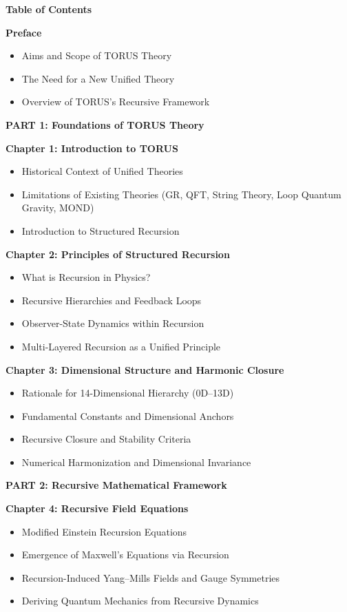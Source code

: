 \documentclass[
]{article}
\author{}
\date{}
\begin{document}
\textbf{Table of Contents}

\textbf{Preface}

\begin{itemize}
\item
  Aims and Scope of TORUS Theory
\item
  The Need for a New Unified Theory
\item
  Overview of TORUS's Recursive Framework
\end{itemize}

\textbf{PART 1: Foundations of TORUS Theory}

\textbf{Chapter 1: Introduction to TORUS}

\begin{itemize}
\item
  Historical Context of Unified Theories
\item
  Limitations of Existing Theories (GR, QFT, String Theory, Loop Quantum
  Gravity, MOND)
\item
  Introduction to Structured Recursion
\end{itemize}

\textbf{Chapter 2: Principles of Structured Recursion}

\begin{itemize}
\item
  What is Recursion in Physics?
\item
  Recursive Hierarchies and Feedback Loops
\item
  Observer-State Dynamics within Recursion
\item
  Multi-Layered Recursion as a Unified Principle
\end{itemize}

\textbf{Chapter 3: Dimensional Structure and Harmonic Closure}

\begin{itemize}
\item
  Rationale for 14-Dimensional Hierarchy (0D--13D)
\item
  Fundamental Constants and Dimensional Anchors
\item
  Recursive Closure and Stability Criteria
\item
  Numerical Harmonization and Dimensional Invariance
\end{itemize}

\textbf{PART 2: Recursive Mathematical Framework}

\textbf{Chapter 4: Recursive Field Equations}

\begin{itemize}
\item
  Modified Einstein Recursion Equations
\item
  Emergence of Maxwell's Equations via Recursion
\item
  Recursion-Induced Yang--Mills Fields and Gauge Symmetries
\item
  Deriving Quantum Mechanics from Recursive Dynamics
\end{itemize}
\end{document}
